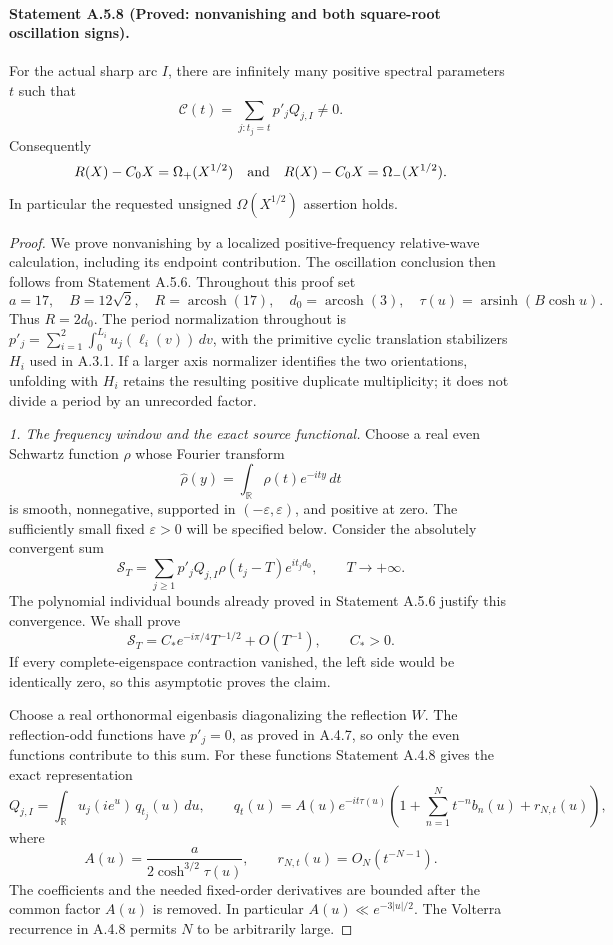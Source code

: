 \paragraph{Statement A.5.8 (Proved: nonvanishing and both square-root oscillation signs).}
For the actual sharp arc $I$, there are infinitely many positive
spectral parameters $t$ such that
\[
 \mathcal C(t)=\sum_{j:t_j=t}p'_jQ_{j,I}\ne0.
\]
Consequently
\[
 R(X)-C_0X=\Omega_+(X^{1/2})
 \quad\hbox{and}\quad
 R(X)-C_0X=\Omega_-(X^{1/2}).
\]
In particular the requested unsigned $\Omega(X^{1/2})$ assertion holds.

\begin{proof}
We prove nonvanishing by a localized positive-frequency relative-wave
calculation, including its endpoint contribution. The oscillation
conclusion then follows from Statement A.5.6.
Throughout this proof set
\[
 a=17,\quad B=12\sqrt2,\quad R=\operatorname{arcosh}(17),
 \quad d_0=\operatorname{arcosh}(3),\quad
 \tau(u)=\operatorname{arsinh}(B\cosh u).
\]
Thus $R=2d_0$.
The period normalization throughout is
$p'_j=\sum_{i=1}^2\int_0^{L_i}u_j(\ell_i(v))\,dv$,
with the primitive cyclic translation stabilizers $H_i$ used in
A.3.1. If a larger axis normalizer identifies the two orientations,
unfolding with $H_i$ retains the resulting positive duplicate
multiplicity; it does not divide a period by an unrecorded factor.

\emph{1. The frequency window and the exact source functional.}
Choose a real even Schwartz function $\rho$ whose Fourier transform
\[
 \widehat\rho(y)=\int_{\mathbb R}\rho(t)e^{-ity}\,dt
\]
is smooth, nonnegative, supported in $(-\varepsilon,\varepsilon)$,
and positive at zero. The sufficiently small fixed $\varepsilon>0$
will be specified below.
Consider the absolutely convergent sum
\begin{equation}\label{A:nonvanishing-window}
 \mathscr S_T=
 \sum_{j\geq1}p'_jQ_{j,I}\rho(t_j-T)e^{it_jd_0},
 \qquad T\to+\infty.
\end{equation}
The polynomial individual bounds already proved in Statement A.5.6
justify this convergence. We shall prove
\begin{equation}\label{A:nonvanishing-wave-asymptotic}
 \mathscr S_T=C_*e^{-i\pi/4}T^{-1/2}+O(T^{-1}),
 \qquad C_*>0.
\end{equation}
If every complete-eigenspace contraction vanished, the left side
would be identically zero, so this asymptotic proves the claim.

Choose a real orthonormal eigenbasis diagonalizing the reflection $W$.
The reflection-odd functions have $p'_j=0$, as proved in A.4.7,
so only the even functions contribute to this sum.
For these functions Statement A.4.8 gives the exact representation
\[
 Q_{j,I}=\int_{\mathbb R}u_j(i e^u)\,q_{t_j}(u)\,du,
 \qquad
 q_t(u)=
 A(u)e^{-it\tau(u)}
   \left(1+\sum_{n=1}^{N}t^{-n}b_n(u)+r_{N,t}(u)\right),
\]
where
\[
 A(u)=\frac{a}{2\cosh^{3/2}\tau(u)},\qquad
 r_{N,t}(u)=O_N(t^{-N-1}).
\]
The coefficients and the needed fixed-order derivatives are bounded
after the common factor $A(u)$ is removed.
In particular $A(u)\ll e^{-3|u|/2}$.
The Volterra recurrence in A.4.8 permits $N$ to be arbitrarily large.


\end{proof}
